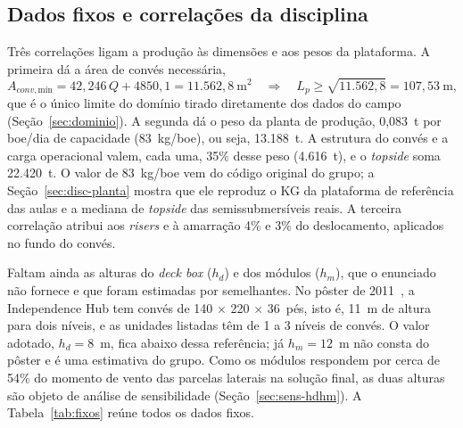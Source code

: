 \documentclass[11pt,a4paper]{article}
\begin{document}
\subsection{Dados fixos e correlações da disciplina}\label{sec:fixos}

Três correlações ligam a produção às dimensões e aos pesos da plataforma. A primeira dá a área de
convés necessária,
\begin{equation}
A_{conv,\text{mín}} = 42{,}246\,Q + 4850{,}1 = 11.562{,}8~\text{m}^2
\quad\Rightarrow\quad L_p \ge \sqrt{11.562{,}8} = 107{,}53~\text{m},
\end{equation}
que é o único limite do domínio tirado diretamente dos dados do campo
(Seção~\ref{sec:dominio}). A segunda dá o peso da planta de produção, 0,083~t por boe/dia de
capacidade (83~kg/boe), ou seja, 13.188~t. A estrutura do convés e a carga operacional valem,
cada uma, 35\% desse peso (4.616~t), e o \emph{topside} soma 22.420~t. O valor de 83~kg/boe vem
do código original do grupo; a Seção~\ref{sec:disc-planta} mostra que ele reproduz o KG da
plataforma de referência das aulas e a mediana de \emph{topside} das semissubmersíveis reais. A
terceira correlação atribui aos \emph{risers} e à amarração 4\% e 3\% do deslocamento, aplicados
no fundo do convés.

Faltam ainda as alturas do \emph{deck box} ($h_d$) e dos módulos ($h_m$), que o enunciado não
fornece e que foram estimadas por semelhantes. No pôster de 2011~\cite{poster}, a Independence Hub
tem convés de 140 × 220 × 36~pés, isto é, 11~m de altura para dois níveis, e as unidades listadas
têm de 1 a 3 níveis de convés. O valor adotado, $h_d = 8$~m, fica abaixo dessa referência; já
$h_m = 12$~m não consta do pôster e é uma estimativa do grupo. Como os módulos respondem por cerca
de 54\% do momento de vento das parcelas laterais na solução final, as duas alturas são objeto de
análise de sensibilidade (Seção~\ref{sec:sens-hdhm}). A Tabela~\ref{tab:fixos} reúne todos os
dados fixos.
\end{document}
